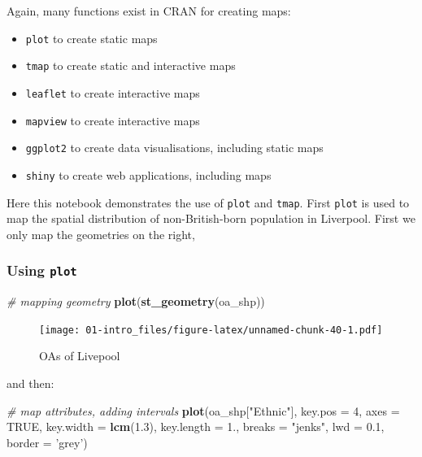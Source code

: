 \documentclass[]{book}
\newenvironment{Shaded}{\begin{snugshade}}{\end{snugshade}}
\newcommand{\CommentTok}[1]{\textcolor[rgb]{0.56,0.35,0.01}{\textit{#1}}}
\newcommand{\DataTypeTok}[1]{\textcolor[rgb]{0.13,0.29,0.53}{#1}}
\newcommand{\DecValTok}[1]{\textcolor[rgb]{0.00,0.00,0.81}{#1}}
\newcommand{\FloatTok}[1]{\textcolor[rgb]{0.00,0.00,0.81}{#1}}
\newcommand{\KeywordTok}[1]{\textcolor[rgb]{0.13,0.29,0.53}{\textbf{#1}}}
\newcommand{\NormalTok}[1]{#1}
\newcommand{\OtherTok}[1]{\textcolor[rgb]{0.56,0.35,0.01}{#1}}
\newcommand{\StringTok}[1]{\textcolor[rgb]{0.31,0.60,0.02}{#1}}
\providecommand{\tightlist}{%
  \setlength{\itemsep}{0pt}\setlength{\parskip}{0pt}}
\begin{document}
Again, many functions exist in CRAN for creating maps:

\begin{itemize}
\tightlist
\item
  \texttt{plot} to create static maps
\item
  \texttt{tmap} to create static and interactive maps
\item
  \texttt{leaflet} to create interactive maps
\item
  \texttt{mapview} to create interactive maps
\item
  \texttt{ggplot2} to create data visualisations, including static maps
\item
  \texttt{shiny} to create web applications, including maps
\end{itemize}

Here this notebook demonstrates the use of \texttt{plot} and \texttt{tmap}. First \texttt{plot} is used to map the spatial distribution of non-British-born population in Liverpool. First we only map the geometries on the right,

\hypertarget{using-plot}{%
\subsubsection{\texorpdfstring{Using \texttt{plot}}{Using plot}}\label{using-plot}}

\begin{Shaded}
\begin{Highlighting}[]
\CommentTok{# mapping geometry}
\KeywordTok{plot}\NormalTok{(}\KeywordTok{st_geometry}\NormalTok{(oa_shp))}
\end{Highlighting}
\end{Shaded}

\begin{figure}
\centering
\texttt{[image: 01-intro\_files/figure-latex/unnamed-chunk-40-1.pdf]}
\caption{\label{fig:unnamed-chunk-40}OAs of Livepool}
\end{figure}

and then:

\begin{Shaded}
\begin{Highlighting}[]
\CommentTok{# map attributes, adding intervals}
\KeywordTok{plot}\NormalTok{(oa_shp[}\StringTok{"Ethnic"}\NormalTok{], }\DataTypeTok{key.pos =} \DecValTok{4}\NormalTok{, }\DataTypeTok{axes =} \OtherTok{TRUE}\NormalTok{, }\DataTypeTok{key.width =} \KeywordTok{lcm}\NormalTok{(}\FloatTok{1.3}\NormalTok{), }\DataTypeTok{key.length =} \FloatTok{1.}\NormalTok{,}
     \DataTypeTok{breaks =} \StringTok{"jenks"}\NormalTok{, }\DataTypeTok{lwd =} \FloatTok{0.1}\NormalTok{, }\DataTypeTok{border =} \StringTok{'grey'}\NormalTok{) }
\end{Highlighting}
\end{Shaded}
\end{document}
